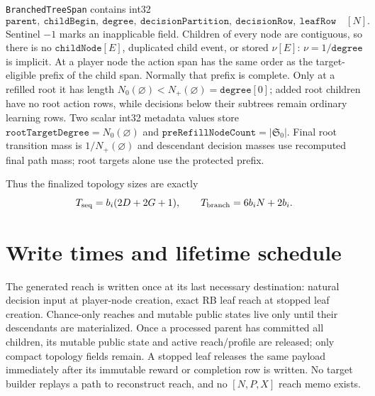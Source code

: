 \documentclass[10pt,a4paper]{article}
\newcommand{\Obj}[1]{\texttt{#1}}
\begin{document}
\Obj{BranchedTreeSpan} contains int32
\[
 \mathtt{parent},\ \mathtt{childBegin},\ \mathtt{degree},\
 \mathtt{decisionPartition},\ \mathtt{decisionRow},\ \mathtt{leafRow}
 \quad [N].
\]
Sentinel $-1$ marks an inapplicable field.  Children of every node are
contiguous, so there is no $\mathtt{childNode}[E]$, duplicated child event, or
stored $\nu[E]$: $\nu=1/\mathtt{degree}$ is implicit.  At a player node the
action span has the same order as the target-eligible prefix of the child span.
Normally that prefix is complete.  Only at a refilled root it has length
$N_0(\varnothing)<N_+(\varnothing)=\mathtt{degree}[0]$; added root children
have no root action rows, while decisions below their subtrees remain ordinary
learning rows.  Two scalar int32 metadata values store
$\mathtt{rootTargetDegree}=N_0(\varnothing)$ and
$\mathtt{preRefillNodeCount}=|\mathfrak S_0|$.  Final root transition mass is
$1/N_+(\varnothing)$ and descendant decision masses use recomputed final path
mass; root targets alone use the protected prefix.

Thus the finalized topology sizes are exactly
\[
 T_{\rm seq}=b_i(2D+2G+1),\qquad
 T_{\rm branch}=6b_iN+2b_i.
\]

\section{Write times and lifetime schedule}

The generated reach is written once at its last necessary destination:
natural decision input at player-node creation, exact RB leaf reach at stopped
leaf creation.  Chance-only reaches and mutable public states live only until
their descendants are materialized.  Once a processed parent has committed
all children, its mutable public state and active reach/profile are released;
only compact topology fields remain.  A stopped leaf releases the same
payload immediately after its immutable reward or completion row is written.
No target builder replays a path to reconstruct reach, and no $[N,P,X]$ reach
memo exists.
\end{document}
